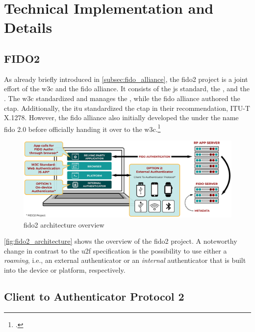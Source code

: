 \section{Technical Implementation and Details}

\subsection{FIDO2}

As already briefly introduced in \autoref{subsec:fido_alliance}, the \gls{fido}2 project is a joint effort of the \gls{w3c} and the \gls{fido} alliance. It consists of the \gls{js} standard, the \wa{}, and the . The \gls{w3c} standardized and manages the \wa{}, while the \gls{fido} alliance authored the \gls{ctap}. Additionally, the \gls{itu} standardized the \gls{ctap} in their recommendation, ITU-T X.1278. However, the \gls{fido} alliance also initially developed the \wa{} under the name \gls{fido} 2.0 before officially handing it over to the \gls{w3c}.\footcites[See][254]{Schwartz2018}[See][3]{FormalVerificationWebAuthn}[See][]{itu-ctap2}

\begin{figure}[hbt]
	\centering
	\includegraphics[width=\textwidth]{pics/FIDO2-Graphic-v2.eps}
	\caption[\gls{fido}2 architecture overview]{\gls{fido}2 architecture overview\footnotemark}
	\label{fig:fido2_architecture}
\end{figure}

\autoref{fig:fido2_architecture} shows the overview of the \gls{fido}2 project. A noteworthy change in contrast to the \gls{u2f} specification is the possibility to use either a \textit{roaming}, i.e., an external authenticator or an \textit{internal} authenticator that is built into the device or platform, respectively.

\subsection{Client to Authenticator Protocol 2}

